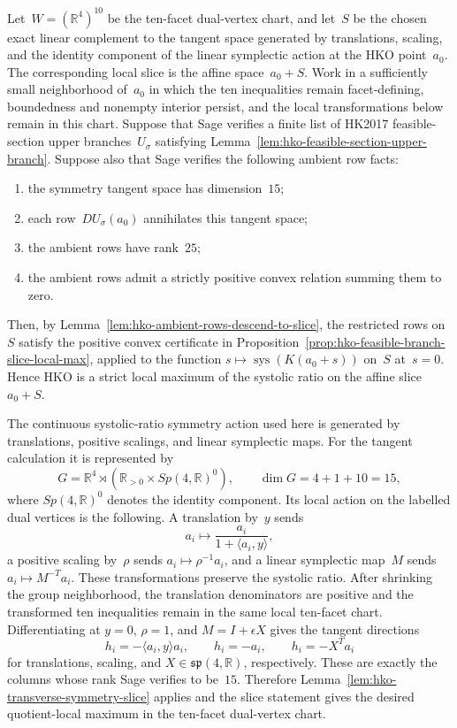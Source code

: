 \begin{corollary}
\label{cor:hko-feasible-branch-quotient-template}
Let~$W=(\mathbb R^4)^{10}$ be the ten-facet dual-vertex chart, and let~$S$
be the chosen exact linear complement to the tangent space generated by
translations, scaling, and the identity component of the linear symplectic
action at the HKO point~$a_0$.  The corresponding local slice is the affine
space~$a_0+S$.  Work in a sufficiently small neighborhood of~$a_0$ in which
the ten inequalities remain facet-defining, boundedness and nonempty interior
persist, and the local transformations below remain in this chart.
Suppose that Sage verifies a finite list of HK2017
feasible-section upper branches~$U_\sigma$ satisfying
Lemma~\ref{lem:hko-feasible-section-upper-branch}.  Suppose also that Sage
verifies the following ambient row facts:
\begin{enumerate}
  \item the symmetry tangent space has dimension~$15$;
  \item each row~$DU_\sigma(a_0)$ annihilates this tangent space;
  \item the ambient rows have rank~$25$;
  \item the ambient rows admit a strictly positive convex relation summing
    them to zero.
\end{enumerate}
Then, by Lemma~\ref{lem:hko-ambient-rows-descend-to-slice}, the restricted
rows on~$S$ satisfy the positive convex certificate in
Proposition~\ref{prop:hko-feasible-branch-slice-local-max}, applied to the
function $s\mapsto\operatorname{sys}(K(a_0+s))$ on~$S$ at~$s=0$.  Hence HKO
is a strict local maximum of the systolic ratio on the affine slice~$a_0+S$.

The continuous systolic-ratio symmetry action used here is generated by
translations, positive scalings, and linear symplectic maps. For the tangent
calculation it is represented by
\[
  G=\mathbb R^4\rtimes(\mathbb R_{>0}\times Sp(4,\mathbb R)^0),
  \qquad
  \dim G=4+1+10=15,
\]
where $Sp(4,\mathbb R)^0$ denotes the identity component.  Its local action on
the labelled dual vertices is the following.  A translation by~$y$ sends
\[
  a_i\mapsto \frac{a_i}{1+\langle a_i,y\rangle},
\]
a positive scaling by~$\rho$ sends $a_i\mapsto \rho^{-1}a_i$, and a linear
symplectic map~$M$ sends $a_i\mapsto M^{-T}a_i$.  These transformations
preserve the systolic ratio.  After shrinking the group neighborhood, the
translation denominators are positive and the transformed ten inequalities
remain in the same local ten-facet chart.  Differentiating at $y=0$, $\rho=1$,
and $M=I+\epsilon X$ gives the tangent directions
\[
  h_i=-\langle a_i,y\rangle a_i,
  \qquad
  h_i=-a_i,
  \qquad
  h_i=-X^Ta_i
\]
for translations, scaling, and $X\in\mathfrak{sp}(4,\mathbb R)$,
respectively.  These are exactly the columns whose rank Sage verifies to
be~$15$.  Therefore
Lemma~\ref{lem:hko-transverse-symmetry-slice} applies and the slice statement
gives the desired quotient-local maximum in the ten-facet dual-vertex chart.
\end{corollary}

